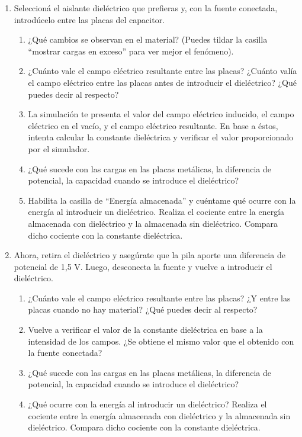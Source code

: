 \documentclass[12pt]{report}
\begin{document}
\begin{enumerate}
    \item Seleccioná el aislante dieléctrico que prefieras y, con la fuente conectada, introdúcelo entre las placas del capacitor.
    \begin{enumerate}
        \item ¿Qué cambios se observan en el material? (Puedes tildar la casilla “mostrar cargas en exceso” para ver mejor el fenómeno).
        \item ¿Cuánto vale el campo eléctrico resultante entre las placas? ¿Cuánto valía el campo eléctrico entre las placas antes de introducir el dieléctrico? ¿Qué puedes decir al respecto?
        \item La simulación te presenta el valor del campo eléctrico inducido, el campo eléctrico en el vacío, y el campo eléctrico resultante. En base a éstos, intenta calcular la constante dieléctrica y verificar el valor proporcionado por el simulador.
        \item ¿Qué sucede con las cargas en las placas metálicas, la diferencia de potencial, la capacidad cuando se introduce el dieléctrico?
        \item Habilita la casilla de “Energía almacenada” y cuéntame qué ocurre con la energía al introducir un dieléctrico. Realiza el cociente entre la energía almacenada con dieléctrico y la almacenada sin dieléctrico. Compara dicho cociente con la constante dieléctrica.
    \end{enumerate}
    \item Ahora, retira el dieléctrico y asegúrate que la pila aporte una diferencia de potencial de 1,5 V. Luego, desconecta la fuente y vuelve a introducir el dieléctrico.
    \begin{enumerate}
        \item ¿Cuánto vale el campo eléctrico resultante entre las placas? ¿Y entre las placas cuando no hay material? ¿Qué puedes decir al respecto?
        \item Vuelve a verificar el valor de la constante dieléctrica en base a la intensidad de los campos. ¿Se obtiene el mismo valor que el obtenido con la fuente conectada?
        \item ¿Qué sucede con las cargas en las placas metálicas, la diferencia de potencial, la capacidad cuando se introduce el dieléctrico?
        \item ¿Qué ocurre con la energía al introducir un dieléctrico? Realiza el cociente entre la energía almacenada con dieléctrico y la almacenada sin dieléctrico. Compara dicho cociente con la constante dieléctrica.
    \end{enumerate}
\end{enumerate}
\end{document}
